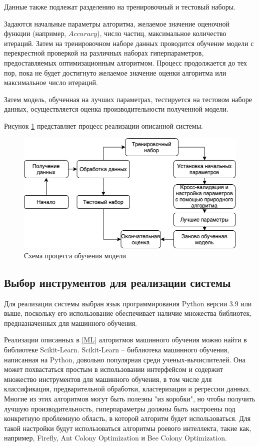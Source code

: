 Данные также подлежат разделению на тренировочный и тестовый наборы.

Задаются начальные параметры алгоритма, желаемое значение оценочной функции (например, $Accuracy$),
число частиц, максимальное количество итераций. Затем на тренировочном наборе данных
проводится обучение модели с перекрестной проверкой на различных наборах
гиперпараметров, предоставляемых оптимизационным алгоритмом. Процесс продолжается
до тех пор, пока не будет достигнуто желаемое значение оценки алгоритма или
максимальное число итераций.

Затем модель, обученная на лучших параметрах, тестируется на тестовом наборе данных,
осуществляется оценка производительности полученной модели.

Рисунок \ref{scheme} представляет процесс реализации описанной системы.

\begin{figure}[H]
    \centering
    \includegraphics[width=140mm]{prog.png}
    \caption{Схема процесса обучения модели}
    \label{scheme}
\end{figure}

\subsection{Выбор инструментов для реализации системы}

Для реализации системы выбран язык программирования Python версии 3.9 или выше,
поскольку его использование обеспечивает наличие множества библиотек,
предназначенных для машинного обучения.

Реализации описанных в \ref{ML} алгоритмов машинного обучения
можно найти в библиотеке Scikit-Learn. Scikit-Learn --
библиотека машинного обучения, написанная на Python, довольно популярная
среди ученых-вычислителей. Она может похвастаться простым в использовании
интерфейсом и содержит множество инструментов для машинного обучения, в том числе
для классификация, предварительной обработки, кластеризации и регрессии данных.
Многие из этих алгоритмов могут быть полезны "из коробки", но чтобы получить
лучшую производительность, гиперпараметры должны быть настроены под конкретную
проблемную область, в которой алгоритм будет использоваться. Для такой настройки
будут использоваться алгоритмы роевого интеллекта, такие как, например, Firefly, Ant
Colony Optimization и Bee Colony Optimization.
